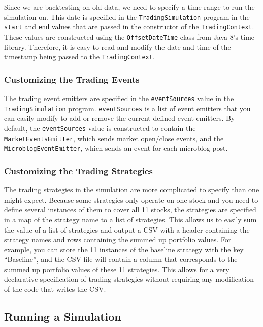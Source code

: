 Since we are backtesting on old data, we need to specify a time range to run the simulation on.
This date is specified in the \texttt{TradingSimulation} program in the \texttt{start} and \texttt{end} values that are passed in the constructor of the \texttt{TradingContext}.
These values are constructed using the \texttt{OffsetDateTime} class from Java 8's time library.
Therefore, it is easy to read and modify the date and time of the timestamp being passed to the \texttt{TradingContext}.

\subsubsection{Customizing the Trading Events}

The trading event emitters are specified in the \texttt{eventSources} value in the \texttt{TradingSimulation} program.
\texttt{eventSources} is a list of event emitters that you can easily modify to add or remove the current defined event emitters.
By default, the \texttt{eventSources} value is constructed to contain the \texttt{MarketEventsEmitter}, which sends market open/close events, and the \texttt{MicroblogEventEmitter}, which sends an event for each microblog post.

\subsubsection{Customizing the Trading Strategies}

The trading strategies in the simulation are more complicated to specify than one might expect.
Because some strategies only operate on one stock and you need to define several instances of them to cover all 11 stocks, the strategies are specified in a map of the strategy name to a list of strategies.
This allows us to easily sum the value of a list of strategies and output a CSV with a header containing the strategy names and rows containing the summed up portfolio values.
For example, you can store the 11 instances of the baseline strategy with the key ``Baseline'', and the CSV file will contain a column that corresponds to the summed up portfolio values of these 11 strategies.
This allows for a very declarative specification of trading strategies without requiring any modification of the code that writes the CSV.

\subsection{Running a Simulation}

